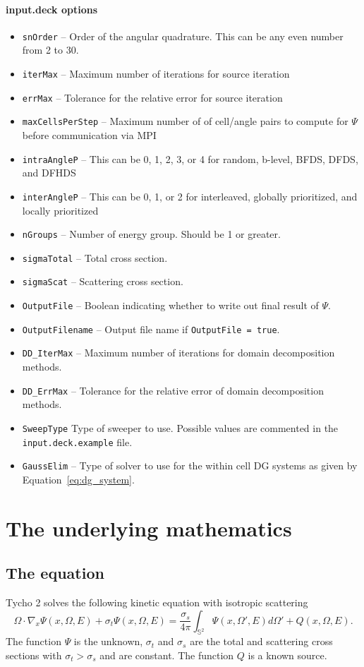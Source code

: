 \documentclass[12pt,letterpaper]{article}
\begin{document}
\paragraph{input.deck options}
\begin{itemize}
\item {\tt snOrder} -- Order of the angular quadrature.  This can be any even number from 2 to 30.
\item {\tt iterMax} -- Maximum number of iterations for source iteration
\item {\tt errMax} -- Tolerance for the relative error for source iteration
\item {\tt maxCellsPerStep} -- Maximum number of of cell/angle pairs to compute for $\Psi$ before communication via MPI
\item {\tt intraAngleP} -- This can be 0, 1, 2, 3, or 4 for random, b-level, BFDS, DFDS, and DFHDS
\item {\tt interAngleP} -- This can be 0, 1, or 2 for interleaved, globally prioritized, and locally prioritized
\item {\tt nGroups} -- Number of energy group.  Should be 1 or greater.
\item {\tt sigmaTotal} -- Total cross section.
\item {\tt sigmaScat} -- Scattering cross section.
\item {\tt OutputFile} -- Boolean indicating whether to write out final result of $\Psi$.
\item {\tt OutputFilename} -- Output file name if {\tt OutputFile = true}.
\item {\tt DD\_IterMax} -- Maximum number of iterations for domain decomposition methods.
\item {\tt DD\_ErrMax} -- Tolerance for the relative error of domain decomposition methods.
\item {\tt SweepType} Type of sweeper to use.  Possible values are commented in the {\tt input.deck.example} file.
\item {\tt GaussElim} -- Type of solver to use for the within cell DG systems as given by Equation~\eqref{eq:dg_system}.
\end{itemize}





\section{The underlying mathematics}
\subsection{The equation}
Tycho 2 solves the following kinetic equation with isotropic scattering
\begin{equation} \label{eq:main}
\Omega \cdot \nabla_x \Psi(x,\Omega,E) + \sigma_t \Psi(x,\Omega,E) = \frac{\sigma_s}{4\pi} \int_{\mathbb{S}^2} \Psi(x,\Omega',E) d\Omega' + Q(x,\Omega,E).
\end{equation}
The function $\Psi$ is the unknown, $\sigma_t$ and $\sigma_s$ are the total and scattering cross sections with $\sigma_t > \sigma_s$ and are constant.
The function $Q$ is a known source.
\end{document}
